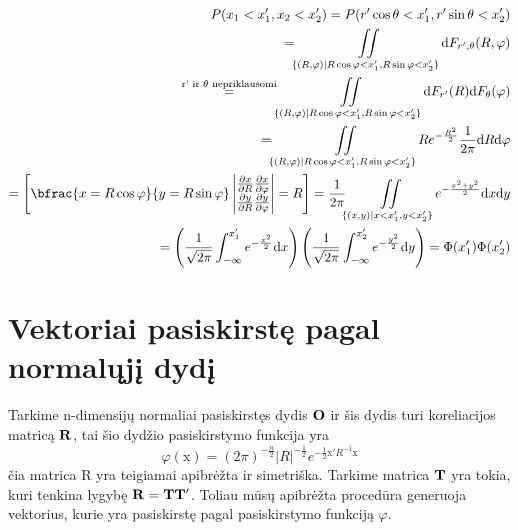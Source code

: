 \documentclass[12pt]{article}
\begin{document}
\begin{equation}
\begin{split}
P(x_1<x_1',x_2<x_2') = P(r'\cos\theta <x_1',r'\sin\theta<x_2') \\
=\iint\limits_{\{(R,\varphi)|R\cos\varphi<x_1',R\sin\varphi<x_2'\}}\mathrm{d}F_{r',\theta}(R,\varphi)\\
\overset{\textnormal{r' ir $\theta$ nepriklausomi}}{=} \iint\limits_{\{(R,\varphi)|R\cos\varphi<x_1',R\sin\varphi<x_2'\}}\mathrm{d}F_{r'}(R)\mathrm{d}F_{\theta}(\varphi) \\
=\iint\limits_{\{(R,\varphi)|R\cos\varphi<x_1',R\sin\varphi<x_2'\}}  Re^{-\frac{R^2}{2}}\frac{1}{2\pi}\mathrm{d}R\mathrm{d}\varphi\\
=
\begin{bmatrix}
\bfrac{x = R\cos \varphi}{y = R\sin \varphi} 
\begin{vmatrix}
\frac{\partial x}{\partial R} \frac{\partial x}{\partial \varphi}\\
\frac{\partial y}{\partial R} \frac{\partial y}{\partial \varphi}
\end{vmatrix} = R
\end{bmatrix} = \frac{1}{2\pi}\iint\limits_{\{(x,y)|x<x_1',y<x_2'\}}e^{-\frac{x^2+y^2}{2}}\mathrm{d}x\mathrm{d}y\\
=\left( \frac{1}{\sqrt{2\pi}}\int_{-\infty}^{x_1'}e^{-\frac{x^2}{2}}\mathrm{d}x\right) 
\left(\frac{1}{\sqrt{2\pi}}\int_{-\infty}^{x_2'}e^{-\frac{y^2}{2}}\mathrm{d}y\right) = \Phi(x_1')\Phi(x_2')
\end{split} \nonumber
\end{equation}


\section{Vektoriai pasiskirstę pagal normalųjį dydį}

Tarkime n-dimensijų normaliai pasiskirstęs dydis $\bf{O}$ ir šis dydis turi koreliacijos matricą $\bf{R}$, tai šio dydžio pasiskirstymo funkcija yra 
\begin{equation}
\varphi(\mathrm{x}) = (2\pi)^{-\frac{n}{2}}|R|^{-\frac{1}{2}}e^{-\frac{1}{2}\mathrm{x'}R^{-1}\mathrm{x}}
\end{equation}
čia matrica R yra teigiamai apibrėžta ir simetriška. Tarkime matrica $\bf{T}$ yra tokia, kuri tenkina lygybę $\bf{R = TT'}$. Toliau mūsų apibrėžta procedūra generuoja vektorius, kurie yra pasiskirstę pagal pasiskirstymo funkciją $\varphi$.\\
\end{document}
